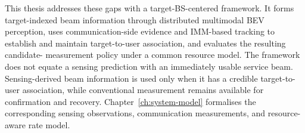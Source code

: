 This thesis addresses these gaps with a target-BS-centered framework.  It forms
target-indexed beam information through distributed multimodal BEV
perception, uses communication-side evidence and IMM-based tracking to establish
and maintain target-to-user association, and evaluates the resulting candidate-
measurement policy under a common resource model.  The framework does not
equate a sensing prediction with an immediately usable service beam.  Sensing-derived
beam information is used only when it has a credible
target-to-user association, while conventional measurement remains available
for confirmation and recovery.  Chapter~\ref{ch:system-model} formalises the
corresponding sensing observations, communication measurements, and
resource-aware rate model.
